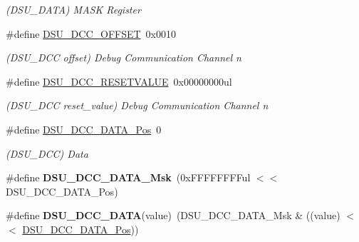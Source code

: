 \begin{DoxyCompactItemize}
\begin{DoxyCompactList}\small\item\em (D\+S\+U\+\_\+\+D\+A\+T\+A) M\+A\+S\+K Register \end{DoxyCompactList}\item 
\hypertarget{group___s_a_m_l21___d_s_u_ga79bf45c7c66b3d6ce28c7c9f9e6b3b89}{}\#define \hyperlink{group___s_a_m_l21___d_s_u_ga79bf45c7c66b3d6ce28c7c9f9e6b3b89}{D\+S\+U\+\_\+\+D\+C\+C\+\_\+\+O\+F\+F\+S\+E\+T}~0x0010\label{group___s_a_m_l21___d_s_u_ga79bf45c7c66b3d6ce28c7c9f9e6b3b89}

\begin{DoxyCompactList}\small\item\em (D\+S\+U\+\_\+\+D\+C\+C offset) Debug Communication Channel n \end{DoxyCompactList}\item 
\hypertarget{group___s_a_m_l21___d_s_u_gaf005efb1f6ed05574d398463365093b8}{}\#define \hyperlink{group___s_a_m_l21___d_s_u_gaf005efb1f6ed05574d398463365093b8}{D\+S\+U\+\_\+\+D\+C\+C\+\_\+\+R\+E\+S\+E\+T\+V\+A\+L\+U\+E}~0x00000000ul\label{group___s_a_m_l21___d_s_u_gaf005efb1f6ed05574d398463365093b8}

\begin{DoxyCompactList}\small\item\em (D\+S\+U\+\_\+\+D\+C\+C reset\+\_\+value) Debug Communication Channel n \end{DoxyCompactList}\item 
\hypertarget{group___s_a_m_l21___d_s_u_ga5d96d9ba36151557c8211afc631280c6}{}\#define \hyperlink{group___s_a_m_l21___d_s_u_ga5d96d9ba36151557c8211afc631280c6}{D\+S\+U\+\_\+\+D\+C\+C\+\_\+\+D\+A\+T\+A\+\_\+\+Pos}~0\label{group___s_a_m_l21___d_s_u_ga5d96d9ba36151557c8211afc631280c6}

\begin{DoxyCompactList}\small\item\em (D\+S\+U\+\_\+\+D\+C\+C) Data \end{DoxyCompactList}\item 
\hypertarget{group___s_a_m_l21___d_s_u_ga10a910bf866c48cce4bafb987cdbe360}{}\#define {\bfseries D\+S\+U\+\_\+\+D\+C\+C\+\_\+\+D\+A\+T\+A\+\_\+\+Msk}~(0x\+F\+F\+F\+F\+F\+F\+F\+Ful $<$$<$ D\+S\+U\+\_\+\+D\+C\+C\+\_\+\+D\+A\+T\+A\+\_\+\+Pos)\label{group___s_a_m_l21___d_s_u_ga10a910bf866c48cce4bafb987cdbe360}

\item 
\hypertarget{group___s_a_m_l21___d_s_u_ga64c66dc7faaa799d1f4f852504d8e65c}{}\#define {\bfseries D\+S\+U\+\_\+\+D\+C\+C\+\_\+\+D\+A\+T\+A}(value)~(D\+S\+U\+\_\+\+D\+C\+C\+\_\+\+D\+A\+T\+A\+\_\+\+Msk \& ((value) $<$$<$ \hyperlink{group___s_a_m_l21___d_s_u_ga5d96d9ba36151557c8211afc631280c6}{D\+S\+U\+\_\+\+D\+C\+C\+\_\+\+D\+A\+T\+A\+\_\+\+Pos}))\label{group___s_a_m_l21___d_s_u_ga64c66dc7faaa799d1f4f852504d8e65c}


\end{DoxyCompactItemize}
